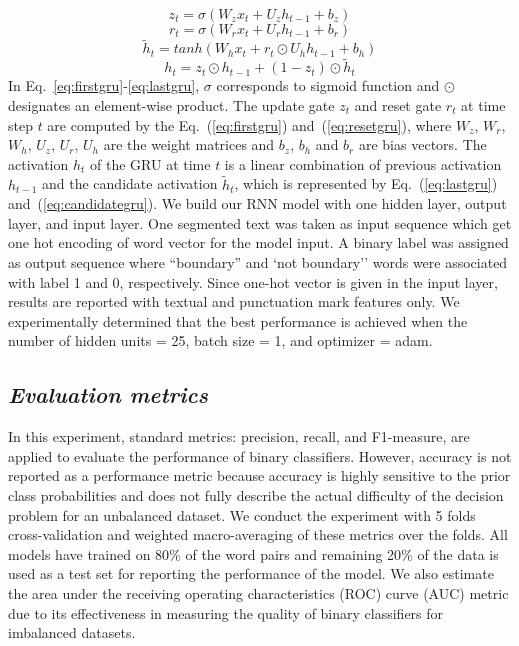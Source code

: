 \documentclass{amia}
\begin{document}
\begin{equation}
z_t = \sigma(W_zx_t + U_zh_{t-1} + b_z)
\label{eq:firstgru}
\end{equation}
\begin{equation}
r_t = \sigma(W_rx_t + U_rh_{t-1} + b_r)
\label{eq:resetgru}
\end{equation}
\begin{equation}
\tilde h_t = tanh(W_hx_t + r_t \odot U_hh_{t-1} + b_h) 
\label{eq:candidategru}
\end{equation}
\begin{equation}
h_t = z_t \odot h_{t-1} + (1-z_t) \odot \tilde h_t
\label{eq:lastgru}
\end{equation}  
In Eq.~\ref{eq:firstgru}-\ref{eq:lastgru}, $\sigma$ corresponds to sigmoid function and $\odot$ designates an element-wise product. The update gate $z_t$ and reset gate $r_t$ at time step $t$ are computed by the Eq.~(\ref{eq:firstgru}) and~(\ref{eq:resetgru}), where $W_z$, $W_r$, $W_h$, $U_z$, $U_r$, $U_h$ are the weight matrices and $b_z$, $b_h$ and $b_r$ are bias vectors. The activation $h_t$ of the GRU at time $t$ is a linear combination of previous activation $h_{t-1}$ and the candidate activation $\tilde h_t$, which is represented by Eq.~(\ref{eq:lastgru}) and~(\ref{eq:candidategru}). We build our RNN model with one hidden layer, output layer, and input layer. One segmented text was taken as input sequence which get one hot encoding of word vector for the model input. A binary label was assigned as output sequence where ``boundary'' and `not boundary'' words were associated with label 1 and 0, respectively. Since one-hot vector is given in the input layer, results are reported with textual and punctuation mark features only. We experimentally determined that the best performance is achieved when the number of hidden units = 25, batch size = 1, and optimizer = adam.         
  
\subsection*{\textit{Evaluation metrics}}
In this experiment, standard metrics: precision, recall, and F1-measure, are applied to evaluate the performance of binary classifiers\cite{aas1999text}. However, accuracy is not reported as a performance metric because accuracy is highly sensitive to the prior class probabilities and does not fully describe the actual difficulty of the decision problem for an unbalanced dataset. We conduct the experiment with 5 folds cross-validation and weighted macro-averaging of these metrics over the folds. All models have trained on 80\% of the word pairs and remaining 20\% of the data is used as a test set for reporting the performance of the model. We also estimate the area under the receiving operating characteristics (ROC) curve\cite{kumar2011receiver} (AUC) metric due to its effectiveness in measuring the quality of binary classifiers for imbalanced datasets\cite{hu2015kernelized}. 
\end{document}
